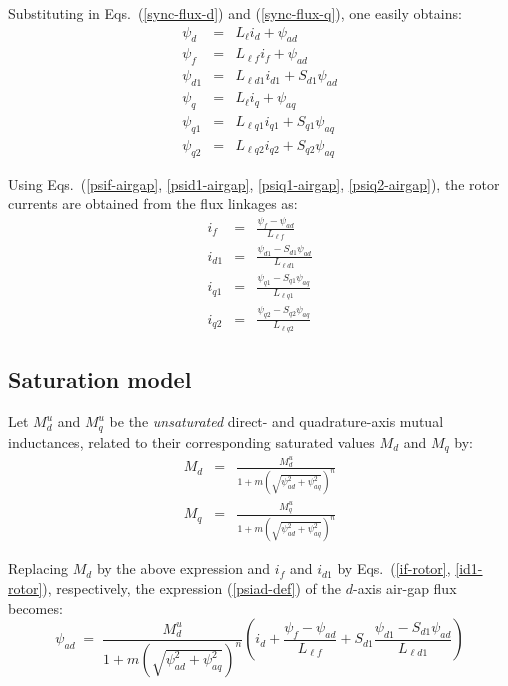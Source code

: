 Substituting in Eqs.~(\ref{sync-flux-d}) and (\ref{sync-flux-q}), one easily obtains:
\begin{eqnarray}
\psi_d & = & L_\ell i_d + \psi_{ad} \label{psid-airgap} \\
\psi_f & = & L_{\ell f} i_f + \psi_{ad} \label{psif-airgap} \\
\psi_{d1} & = & L_{\ell d1} i_{d1} + S_{d1} \psi_{ad} \label{psid1-airgap} \\
\psi_q & = & L_\ell i_q + \psi_{aq} \label{psiq-airgap} \\
\psi_{q1} & = & L_{\ell q1} i_{q1} + S_{q1} \psi_{aq} \label{psiq1-airgap} \\
\psi_{q2} & = & L_{\ell q2} i_{q2} + S_{q2} \psi_{aq} \label{psiq2-airgap}
\end{eqnarray}

Using Eqs.~(\ref{psif-airgap}, \ref{psid1-airgap}, \ref{psiq1-airgap}, \ref{psiq2-airgap}), the rotor currents are obtained from the flux linkages as:
\begin{eqnarray}
i_f & = & \frac{\psi_f - \psi_{ad}}{L_{\ell f}} \label{if-rotor} \\
i_{d1} & = & \frac{\psi_{d1} - S_{d1} \psi_{ad}}{L_{\ell d1}} \label{id1-rotor} \\
i_{q1} & = & \frac{\psi_{q1} - S_{q1} \psi_{aq}}{L_{\ell q1}} \label{iq1-rotor} \\
i_{q2} & = & \frac{\psi_{q2} - S_{q2} \psi_{aq}}{L_{\ell q2}} \label{iq2-rotor}
\end{eqnarray}

\subsection{Saturation model}

Let $M_d^u$ and $M_q^u$ be the {\em unsaturated} direct- and quadrature-axis mutual inductances, related to their corresponding saturated values $M_d$ and $M_q$ by:
\begin{eqnarray}
M_d & = & \frac{M_d^u}{1 + m \left( \sqrt{\psi_{ad}^2 + \psi_{aq}^2} \right)^n} \label{md-sat} \\
M_q & = & \frac{M_q^u}{1 + m \left( \sqrt{\psi_{ad}^2 + \psi_{aq}^2} \right)^n} \label{mq-sat}
\end{eqnarray}

Replacing $M_d$ by the above expression and $i_f$ and $i_{d1}$ by Eqs.~(\ref{if-rotor}, \ref{id1-rotor}), respectively, the expression (\ref{psiad-def}) of the $d$-axis air-gap flux becomes:
\[
\psi_{ad} \; = \; \frac{M_d^u}{1 + m \left( \sqrt{\psi_{ad}^2 + \psi_{aq}^2} \right)^n} ( i_d + \frac{\psi_f - \psi_{ad}}{L_{\ell f}} + S_{d1} \frac{\psi_{d1} - S_{d1} \psi_{ad}}{L_{\ell d1}} )
\]

